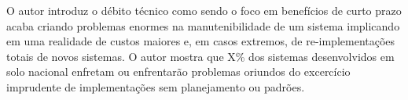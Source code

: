     O autor  introduz o débito técnico como
    sendo o foco em benefícios de curto prazo acaba criando problemas enormes na manutenibilidade
    de um sistema implicando em uma realidade de custos maiores e, em casos extremos,
    de re-implementações totais de novos sistemas. O autor \cite{?} mostra que X\% dos sistemas
    desenvolvidos em solo nacional enfretam ou enfrentarão problemas oriundos do
    excercício imprudente de implementações sem planejamento ou padrões.
    
    
    
    
    
    

\newpage
